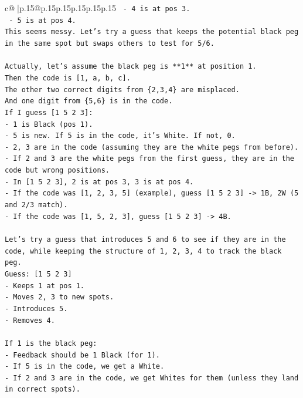 \documentclass{article}
\begin{document}
{\begin{supertabular}{c@{$\;$}|p{.15\linewidth}@{}p{.15\linewidth}p{.15\linewidth}p{.15\linewidth}p{.15\linewidth}p{.15\linewidth}}
{{{\texttt{  {-} 4 is at pos 3.} \\
\texttt{  {-} 5 is at pos 4.} \\
\texttt{This seems messy. Let's try a guess that keeps the potential black peg in the same spot but swaps others to test for 5/6.} \\
\\ 
\texttt{Actually, let's assume the black peg is **1** at position 1.} \\
\texttt{Then the code is {[}1, a, b, c{]}.} \\
\texttt{The other two correct digits from \{2,3,4\} are misplaced.} \\
\texttt{And one digit from \{5,6\} is in the code.} \\
\texttt{If I guess {[}1 5 2 3{]}:} \\
\texttt{{-} 1 is Black (pos 1).} \\
\texttt{{-} 5 is new. If 5 is in the code, it's White. If not, 0.} \\
\texttt{{-} 2, 3 are in the code (assuming they are the white pegs from before).} \\
\texttt{{-} If 2 and 3 are the white pegs from the first guess, they are in the code but wrong positions.} \\
\texttt{{-} In {[}1 5 2 3{]}, 2 is at pos 3, 3 is at pos 4.} \\
\texttt{{-} If the code was {[}1, 2, 3, 5{]} (example), guess {[}1 5 2 3{]} {-}> 1B, 2W (5 and 2/3 match).} \\
\texttt{{-} If the code was {[}1, 5, 2, 3{]}, guess {[}1 5 2 3{]} {-}> 4B.} \\
\\ 
\texttt{Let's try a guess that introduces 5 and 6 to see if they are in the code, while keeping the structure of 1, 2, 3, 4 to track the black peg.} \\
\texttt{Guess: {[}1 5 2 3{]}} \\
\texttt{{-} Keeps 1 at pos 1.} \\
\texttt{{-} Moves 2, 3 to new spots.} \\
\texttt{{-} Introduces 5.} \\
\texttt{{-} Removes 4.} \\
\\ 
\texttt{If 1 is the black peg:} \\
\texttt{{-} Feedback should be 1 Black (for 1).} \\
\texttt{{-} If 5 is in the code, we get a White.} \\
\texttt{{-} If 2 and 3 are in the code, we get Whites for them (unless they land in correct spots).} \\
}}}
\end{supertabular}}
\end{document}

